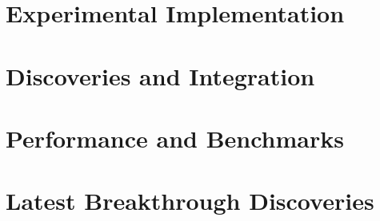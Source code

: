 \documentclass{article}
\begin{document}


\section{Experimental Implementation}





\section{Discoveries and Integration}









\section{Performance and Benchmarks}







\section{Latest Breakthrough Discoveries}










\end{document}
